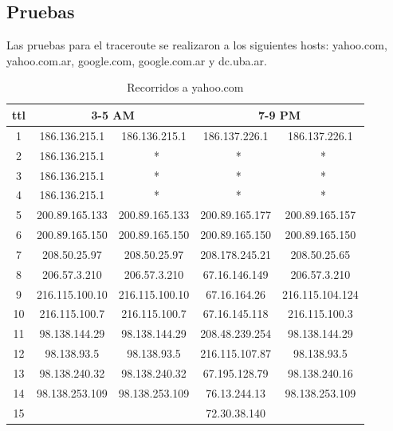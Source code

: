 \documentclass[a4paper]{article}
\begin{document}
 \subsection{Pruebas}
 Las pruebas para el traceroute se realizaron a los siguientes hosts: yahoo.com, yahoo.com.ar, 
 google.com, google.com.ar y dc.uba.ar.
 
 
 \begin{table}[!htb]
 	\begin{center}
 	\begin{tabular}{|c|c|c|c|c|}
 	  \hline
 	  ttl & \multicolumn{2}{|c|}{3-5 AM} & \multicolumn{2}{|c|}{7-9 PM} \\\hline
	  1 	&		186.136.215.1 	&	 186.136.215.1 	&	186.137.226.1	&	186.137.226.1	\\ \hline
	  2 	&		186.136.215.1 	&	 \ * &	 \ * 	&	 \ * 	\\ \hline
	  3 	&		186.136.215.1 	&	 \ * &	 \ * 	&	 \ * 	\\ \hline
	  4 	&		186.136.215.1 	&	 \ * &	 \ * 	&	 \ * 	\\ \hline
	  5 	&	 200.89.165.133 	&	 200.89.165.133 &	200.89.165.177	&	200.89.165.157	\\ \hline
	  6 	&	 200.89.165.150 	&	 200.89.165.150	&	200.89.165.150	&	200.89.165.150	\\ \hline
	  7 	&		208.50.25.97 	&	 208.50.25.97	&	208.178.245.21	&	208.50.25.65	\\ \hline
	  8 	&		206.57.3.210 	&	 206.57.3.210	&	67.16.146.149	&	206.57.3.210	\\ \hline
	  9 	&		216.115.100.10 	&	 216.115.100.10 &	67.16.164.26	&	216.115.104.124	\\ \hline
	  10 	&	 216.115.100.7 	&	 216.115.100.7 &	67.16.145.118	&	216.115.100.3	\\ \hline
	  11 	&	 98.138.144.29 	&	 98.138.144.29 &	208.48.239.254	&	98.138.144.29	\\ \hline
	  12 	&		98.138.93.5		&	 98.138.93.5 &	216.115.107.87	&	98.138.93.5	\\ \hline
	  13 	&		98.138.240.32 	&	 98.138.240.32 &	67.195.128.79	&	98.138.240.16	\\ \hline
	  14 	&		98.138.253.109 	&	 98.138.253.109 &	76.13.244.13	&	98.138.253.109	\\ \hline
	  15	&		&		&	72.30.38.140	&		\\ \hline


 	 \end{tabular}   
 	 \vspace{0pt}
 	 \caption{Recorridos a yahoo.com}
 	\end{center}
 	\label{tab:yahoo.com}
 \end{table}
 
\end{document}
